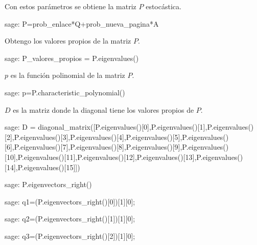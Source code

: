 \par Con estos parámetros se obtiene la matriz $P$ estocástica.
\begin{sagecommandline}
    sage: P=prob_enlace*Q+prob_nueva_pagina*A
\end{sagecommandline}

\par Obtengo los valores propios de la matriz $P$.
\begin{sagecommandline}
    sage: P_valores_propios = P.eigenvalues()
\end{sagecommandline}
\par $p$ es la función polinomial de la matriz $P$.
\begin{sagecommandline}
    sage: p=P.characteristic_polynomial()
\end{sagecommandline}
\par $D$ es la matriz donde la diagonal tiene los valores propios de $P$.
\begin{sagecommandline}
    sage: D = diagonal_matrix([P.eigenvalues()[0],P.eigenvalues()[1],P.eigenvalues()[2],P.eigenvalues()[3],P.eigenvalues()[4],P.eigenvalues()[5],P.eigenvalues()[6],P.eigenvalues()[7],P.eigenvalues()[8],P.eigenvalues()[9],P.eigenvalues()[10],P.eigenvalues()[11],P.eigenvalues()[12],P.eigenvalues()[13],P.eigenvalues()[14],P.eigenvalues()[15]])
\end{sagecommandline}

\begin{sagecommandline}[\textwidth]
    sage: P.eigenvectors_right()
\end{sagecommandline}
    
\begin{sagecommandline}
    sage: q1=(P.eigenvectors_right()[0])[1][0];
\end{sagecommandline}

\begin{sagecommandline}
    sage: q2=(P.eigenvectors_right()[1])[1][0];
\end{sagecommandline}

\begin{sagecommandline}
    sage: q3=(P.eigenvectors_right()[2])[1][0];
\end{sagecommandline}

